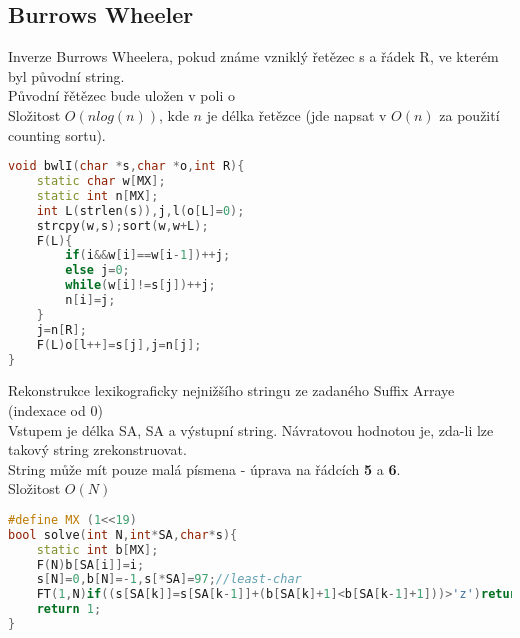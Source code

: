 \documentclass[11pt]{article}
\begin{document}
\subsection{Burrows Wheeler}
Inverze Burrows Wheelera, pokud známe vzniklý řetězec \textsf{s} a řádek \textsf{R}, ve kterém byl původní string.
\\Původní řětězec bude uložen v poli \textsf{o}
\\Složitost $O(nlog(n))$, kde $n$ je délka řetězce (jde napsat v $O(n)$ za použití counting sortu).
\begin{lstlisting}[language=C++]
void bwlI(char *s,char *o,int R){
    static char w[MX];
    static int n[MX];
    int L(strlen(s)),j,l(o[L]=0);
    strcpy(w,s);sort(w,w+L);
    F(L){
        if(i&&w[i]==w[i-1])++j;
        else j=0;
        while(w[i]!=s[j])++j;
        n[i]=j;
    }
    j=n[R];
    F(L)o[l++]=s[j],j=n[j];
}
\end{lstlisting}
Rekonstrukce lexikograficky nejnižšího stringu ze zadaného Suffix Arraye (indexace od 0)
\\Vstupem je délka SA, SA a výstupní string. Návratovou hodnotou je, zda-li lze takový string zrekonstruovat.
\\String může mít pouze malá písmena - úprava na řádcích \textbf{5} a \textbf{6}.
\\Složitost $O(N)$
\begin{lstlisting}[language=C++]
#define MX (1<<19)
bool solve(int N,int*SA,char*s){
    static int b[MX];
    F(N)b[SA[i]]=i;
    s[N]=0,b[N]=-1,s[*SA]=97;//least-char
    FT(1,N)if((s[SA[k]]=s[SA[k-1]]+(b[SA[k]+1]<b[SA[k-1]+1]))>'z')return 0;;
    return 1;
}
\end{lstlisting}
\end{document}
